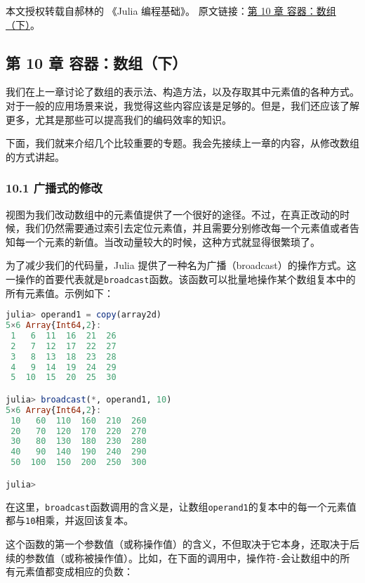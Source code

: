 
本文授权转载自郝林的 《Julia 编程基础》。 原文链接：\href{https://github.com/hyper0x/JuliaBasics/blob/master/book/ch10.md}{第 10 章 容器：数组（下）}。


\subsection{第 10 章 容器：数组（下）}

我们在上一章讨论了数组的表示法、构造方法，以及存取其中元素值的各种方式。对于一般的应用场景来说，我觉得这些内容应该是足够的。但是，我们还应该了解更多，尤其是那些可以提高我们的编码效率的知识。

下面，我们就来介绍几个比较重要的专题。我会先接续上一章的内容，从修改数组的方式讲起。

\subsubsection{10.1 广播式的修改}

视图为我们改动数组中的元素值提供了一个很好的途径。不过，在真正改动的时候，我们仍然需要通过索引去定位元素值，并且需要分别修改每一个元素值或者告知每一个元素的新值。当改动量较大的时候，这种方式就显得很繁琐了。

为了减少我们的代码量，Julia 提供了一种名为广播（broadcast）的操作方式。这一操作的首要代表就是\verb`broadcast`函数。该函数可以批量地操作某个数组复本中的所有元素值。示例如下：

\begin{lstlisting}[language=julia]
julia> operand1 = copy(array2d)
5×6 Array{Int64,2}:
 1   6  11  16  21  26
 2   7  12  17  22  27
 3   8  13  18  23  28
 4   9  14  19  24  29
 5  10  15  20  25  30

julia> broadcast(*, operand1, 10)
5×6 Array{Int64,2}:
 10   60  110  160  210  260
 20   70  120  170  220  270
 30   80  130  180  230  280
 40   90  140  190  240  290
 50  100  150  200  250  300

julia> 
\end{lstlisting}

在这里，\verb`broadcast`函数调用的含义是，让数组\verb`operand1`的复本中的每一个元素值都与\verb`10`相乘，并返回该复本。

这个函数的第一个参数值（或称操作值）的含义，不但取决于它本身，还取决于后续的参数值（或称被操作值）。比如，在下面的调用中，操作符\verb`-`会让数组中的所有元素值都变成相应的负数：


